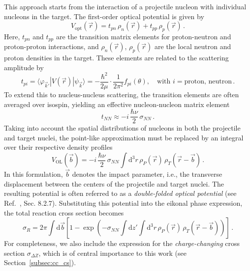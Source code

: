 This approach starts from the interaction of a projectile nucleon with individual nucleons in the target. 
The first-order optical potential is given by
\begin{equation}
V_{\text{opt}}(\vec{r}) = t_{pn} \, \rho_n(\vec{r}) + t_{pp} \, \rho_p(\vec{r}) \, .
\end{equation}
Here, \( t_{pn} \) and \( t_{pp} \) are the transition matrix elements for proton-neutron and proton-proton interactions, and \( \rho_n(\vec{r}) \), \( \rho_p(\vec{r}) \) are the local neutron and proton densities in the target. 
These elements are related to the scattering amplitude by
\begin{equation}
t_{pi} = \langle \varphi_{\vec{k}'} | V(\vec{r}) | \psi_{\vec{k}} \rangle = -\frac{\hbar^2}{2\mu} \cdot \frac{1}{2\pi^2} f_{pi}(\theta), \quad \text{with } i = \text{proton, neutron} \, .
\end{equation}
To extend this to nucleus-nucleus scattering, the transition elements are often averaged over isospin, yielding an effective nucleon-nucleon matrix element
\begin{equation}
t_{NN} \approx -i \, \frac{\hbar \nu}{2} \, \sigma_{NN} \, .
\end{equation}
Taking into account the spatial distributions of nucleons in both the projectile and target nuclei, the point-like approximation must be replaced by an integral over their respective density profiles
\begin{equation}
V_{\text{OL}}(\vec{b}) = -i \, \frac{\hbar \nu}{2} \, \sigma_{NN} \int \mathrm{d}^3 r \, \rho_P(\vec{r}) \, \rho_T(\vec{r} - \vec{b}) \, .
\end{equation}
In this formulation, \( \vec{b} \) denotes the impact parameter, i.e., the transverse displacement between the centers of the projectile and target nuclei. 
The resulting potential is often referred to as a \textit{double-folded optical potential} (see Ref.~\cite{obertelli2021modern}, Sec. 8.2.7).
Substituting this potential into the eikonal phase expression, the total reaction cross section becomes
\begin{equation}\label{eq:final_react_cs}
\sigma_R = 2\pi \int \mathrm{d} \vec{b} \left[ 1 - \exp \left( -\sigma_{NN} \int \mathrm{d} z' \int \mathrm{d}^3 r \, \rho_P(\vec{r}) \, \rho_T(\vec{r} - \vec{b}) \right) \right] \, .
\end{equation}
For completeness, we also include the expression for the \textit{charge-changing} cross section \( \sigma_{\Delta Z} \), which is of central importance to this work (see Section~\ref{subsec:cc_cs}). 
